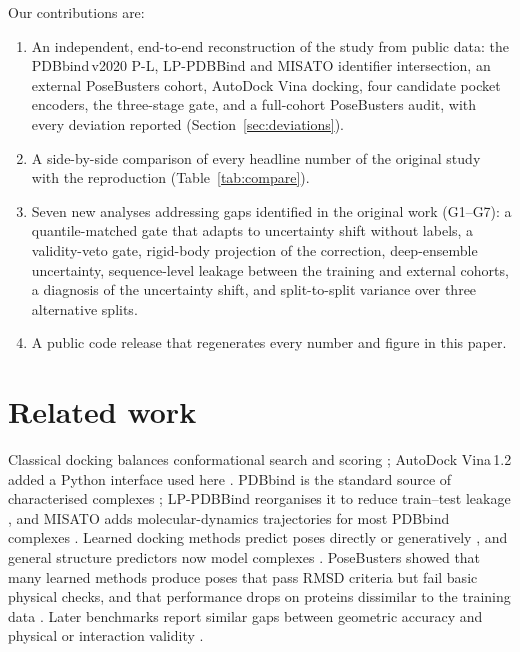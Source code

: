 Our contributions are:
\begin{enumerate}
\item An independent, end-to-end reconstruction of the study from public data: the PDBbind\,v2020 P-L, LP-PDBBind
      and MISATO identifier intersection, an external PoseBusters cohort, AutoDock Vina docking, four candidate pocket
      encoders, the three-stage gate, and a full-cohort PoseBusters audit, with every deviation reported (Section~\ref{sec:deviations}).
\item A side-by-side comparison of every headline number of the original study with the reproduction (Table~\ref{tab:compare}).
\item Seven new analyses addressing gaps identified in the original work (G1--G7): a quantile-matched gate that
      adapts to uncertainty shift without labels, a validity-veto gate, rigid-body projection of the correction, deep-ensemble
      uncertainty, sequence-level leakage between the training and external cohorts, a diagnosis of the uncertainty
      shift, and split-to-split variance over three alternative splits.
\item A public code release that regenerates every number and figure in this paper.
\end{enumerate}

\section{Related work}
Classical docking balances conformational search and scoring \citep{meng1992dock,morris2009autodock4,trott2010vina};
AutoDock Vina\,1.2 added a Python interface used here \citep{eberhardt2021vina}. PDBbind is the standard source of
characterised complexes \citep{wang2004pdbbind,wang2005pdbbind_update}; LP-PDBBind reorganises it to reduce
train--test leakage \citep{li2023lppdbbind}, and MISATO adds molecular-dynamics trajectories for most PDBbind
complexes \citep{siebenmorgen2024misato}. Learned docking methods predict poses directly or generatively
\citep{stark2022equibind,corso2023diffdock,pei2023fabind}, and general structure predictors now model complexes
\citep{jumper2021alphafold,abramson2024af3}. PoseBusters showed that many learned methods produce poses that pass RMSD
criteria but fail basic physical checks, and that performance drops on proteins dissimilar to the training data
\citep{buttenschoen2024posebusters}. Later benchmarks report similar gaps between geometric accuracy and physical or
interaction validity \citep{morehead2026posebench,errington2025interaction,li2025limits,gu2025vs}.

